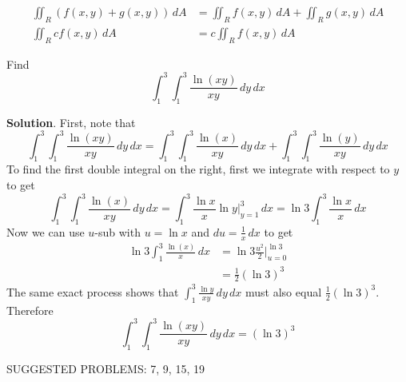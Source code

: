 \documentclass[10pt,]{book}
\theoremstyle{ptxplainnotitle}
\theoremstyle{ptxplaintitle}
\theoremstyle{ptxplainnotitle}
\theoremstyle{ptxplaintitle}
\theoremstyle{ptxplainnotitle}
\theoremstyle{ptxplaintitle}
\theoremstyle{ptxdefinitionnotitle}
\theoremstyle{ptxdefinitiontitle}
\theoremstyle{ptxdefinitionnotitle}
\theoremstyle{ptxdefinitiontitle}
\theoremstyle{ptxdefinitionnotitle}
\theoremstyle{ptxdefinitiontitle}
\theoremstyle{ptxdefinitionnotitle}
\theoremstyle{ptxdefinitiontitle}
\theoremstyle{ptxdefinitionnotitle}
\theoremstyle{ptxdefinitiontitle}
\numberwithin{equation}{section}
\begin{document}
\begin{align*}
\iint_{R}(f(x,y) + g(x,y))\,dA & = \iint_{R}f(x,y)\,dA + \iint_{R}g(x,y)\,dA \\
\iint_{R}cf(x,y)\,dA & = c\iint_{R}f(x,y)\,dA 
\end{align*}
%
\begin{example}\label{example-double-integral-of-a-logarithm}
\hypertarget{p-1125}{}%
Find%
\begin{equation*}
\int_{1}^{3}\int_{1}^{3}\frac{\ln(xy)}{xy}\,dy\,dx
\end{equation*}
%
\par\smallskip%
\noindent\textbf{Solution}.\hypertarget{solution-178}{}\quad%
First, note that%
\begin{equation*}
\int_{1}^{3}\int_{1}^{3}\frac{\ln(xy)}{xy}\,dy\,dx = \int_{1}^{3}\int_{1}^{3}\frac{\ln(x)}{xy}\,dy\,dx + \int_{1}^{3}\int_{1}^{3}\frac{\ln(y)}{xy}\,dy\,dx
\end{equation*}
To find the first double integral on the right, first we integrate with respect to \(y\) to get%
\begin{equation*}
\int_{1}^{3}\int_{1}^{3}\frac{\ln(x)}{xy}\,dy\,dx = \int_{1}^{3}\frac{\ln x}{x}\ln y\big|_{y=1}^{3}\,dx = \ln 3\int_{1}^{3}\frac{\ln x}{x}\,dx
\end{equation*}
Now we can use \(u\)-sub with \(u = \ln x\) and \(du = \frac{1}{x}\,dx\) to get%
\begin{align*}
\ln3\int_{1}^{3}\frac{\ln(x)}{x}\,dx & = \ln3 \frac{u^{2}}{2}\big|_{u=0}^{\ln 3} \\
& = \frac{1}{2}(\ln3)^{3} 
\end{align*}
The same exact process shows that \(\int_{1}^{3}\frac{\ln y}{xy}\,dy\,dx\) must also equal \(\frac{1}{2}(\ln3)^{3}\). Therefore%
\begin{equation*}
\int_{1}^{3}\int_{1}^{3}\frac{\ln(xy)}{xy}\,dy\,dx = (\ln3)^{3}
\end{equation*}
\end{example}
\bigbreak
\hypertarget{p-1126}{}%
SUGGESTED PROBLEMS: 7, 9, 15, 19%
\typeout{************************************************}
\typeout{************************************************}
\end{document}
